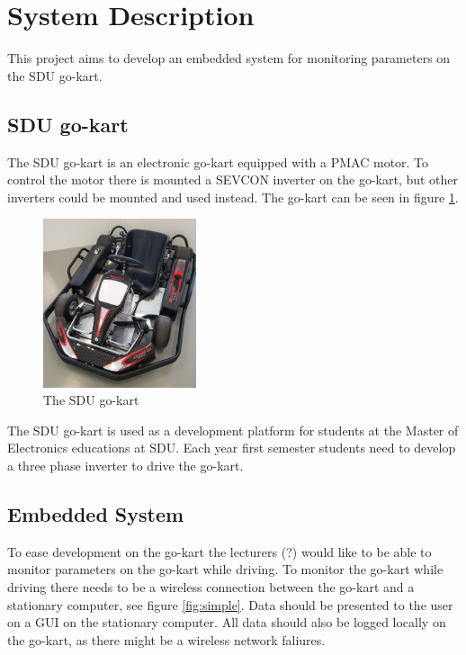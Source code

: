 \section{System Description}
\label{sec:system_description}
This project aims to develop an embedded system for monitoring parameters on the SDU go-kart.

\subsection{SDU go-kart}
The SDU go-kart is an electronic go-kart equipped with a PMAC motor. 
To control the motor there is mounted a SEVCON inverter on the go-kart, but other inverters could be mounted and used instead.
The go-kart can be seen in figure \ref{fig:go_kart}.

\begin{figure}[h]
 	\centering
    \includegraphics[width=0.4\textwidth]{graphics/go_kart}
    \caption{The SDU go-kart}
    \label{fig:go_kart}
\end{figure}

The SDU go-kart is used as a development platform for students at the Master of Electronics educations at SDU.
Each year first semester students need to develop a three phase inverter to drive the go-kart.

\subsection{Embedded System}
To ease development on the go-kart the lecturers (?) would like to be able to monitor parameters on the go-kart while driving.
To monitor the go-kart while driving there needs to be a wireless connection between the go-kart and a stationary computer, see figure \ref{fig:simple}.
Data should be presented to the user on a GUI on the stationary computer.
All data should also be logged locally on the go-kart, as there might be a wireless network faliures. 


